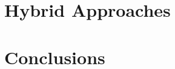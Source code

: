 \documentclass[preprint,12pt]{elsarticle}
\begin{document}

\section{Hybrid Approaches} \label{S:5}

\section{Conclusions} \label{S:6}





\newpage








\end{document}
